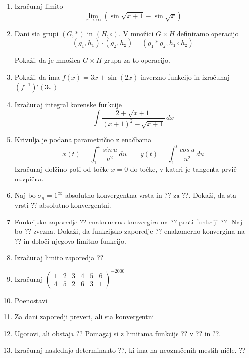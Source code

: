 \documentclass[a4paper,12pt]{article}
\begin{document}
\begin{enumerate}
\item
Izračunaj limito $$\lim_{x\to\infty}(\sin\sqrt{x+1}-\sin\sqrt{x}) $$

\item
Dani sta grupi $(G, \ast) $ in $(H, \circ )$. V množici $G \times H$ definiramo operacijo
 $$(g_1,h_1)\cdot (g_2,h_2)=(g_1\ast g_2,h_1 \circ h_2) $$

Pokaži, da je množica  $G \times H$ grupa za to operacijo.

\item
Pokaži, da ima $f(x)=3x+\sin(2x)$ inverzno funkcijo in izračunaj $(f^{-1})'(3\pi)$.

\item
Izračunaj integral korenske funkcije
$$\int \frac{2+\sqrt{x+1}}{(x+1)^2 - \sqrt{x+1}}\,dx $$

\item
Krivulja je podana parametrično z enačbama
$$x(t)=\int_1^t \frac{sin\,u}{u^2}\,du  \qquad y(t)=\int_1^t \frac{cos\,u}{u^2}\,du $$
Izračunaj dolžino poti od točke $x=0$ do točke, v kateri je tangenta prvič navpična.

\item
Naj bo $\sigma_n=1^\infty$ absolutno konvergentna vrsta in ?? za ??.
Dokaži, da sta vrsti
??
absolutno konvergentni.

\item
Funkcijsko zaporedje ?? enakomerno konvergira na ?? proti funkciji ??.
Naj bo ?? zvezna. Dokaži, da funkcijsko zaporedje ??
enakomerno konvergina na ?? in določi njegovo limitno funkcijo.

\item
Izračunaj limito zaporedja
??
\item
Izračunaj
$
\left(
\begin{array}{cccccc}
	1&2&3&4&5&6\\
	4&5&2&6&3&1
\end{array}
\right)^{-2000}
$

\item
Poenostavi
$$
$$

\item
Za dani zaporedji preveri, ali sta konvergentni


\item
Ugotovi, ali obstaja
??
Pomagaj si z limitama funkcije ?? v ?? in ??.

\item
Izračunaj naslednjo determinanto ??, ki ima na neoznačenih mestih ničle.
??


\end{enumerate}
\end{document}
